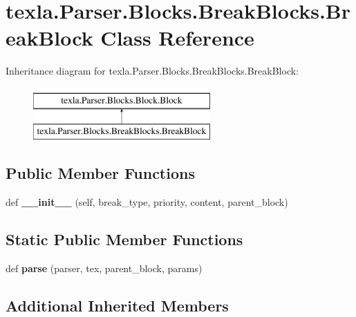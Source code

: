 \hypertarget{classtexla_1_1Parser_1_1Blocks_1_1BreakBlocks_1_1BreakBlock}{}\section{texla.\+Parser.\+Blocks.\+Break\+Blocks.\+Break\+Block Class Reference}
\label{classtexla_1_1Parser_1_1Blocks_1_1BreakBlocks_1_1BreakBlock}
Inheritance diagram for texla.\+Parser.\+Blocks.\+Break\+Blocks.\+Break\+Block\+:\begin{figure}[H]
\begin{center}
\leavevmode
\includegraphics[height=2.000000cm]{classtexla_1_1Parser_1_1Blocks_1_1BreakBlocks_1_1BreakBlock}
\end{center}
\end{figure}
\subsection*{Public Member Functions}
\begin{DoxyCompactItemize}
\item 
\hypertarget{classtexla_1_1Parser_1_1Blocks_1_1BreakBlocks_1_1BreakBlock_a6344aaa52b1730c58f68e35e090d3452}{}\label{classtexla_1_1Parser_1_1Blocks_1_1BreakBlocks_1_1BreakBlock_a6344aaa52b1730c58f68e35e090d3452} 
def {\bfseries \+\_\+\+\_\+init\+\_\+\+\_\+} (self, break\+\_\+type, priority, content, parent\+\_\+block)
\end{DoxyCompactItemize}
\subsection*{Static Public Member Functions}
\begin{DoxyCompactItemize}
\item 
\hypertarget{classtexla_1_1Parser_1_1Blocks_1_1BreakBlocks_1_1BreakBlock_ad1ae2ce55d93242cf3a6ebdee687eb34}{}\label{classtexla_1_1Parser_1_1Blocks_1_1BreakBlocks_1_1BreakBlock_ad1ae2ce55d93242cf3a6ebdee687eb34} 
def {\bfseries parse} (parser, tex, parent\+\_\+block, params)
\end{DoxyCompactItemize}
\subsection*{Additional Inherited Members}


